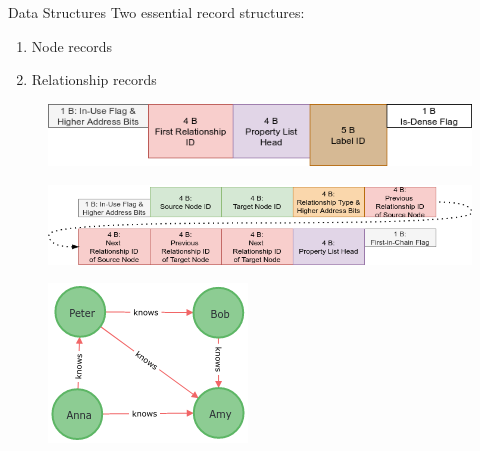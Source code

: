 \documentclass[rgb]{beamer}
\begin{document}
                \begin{frame}[allowframebreaks]{Data Structures}
                    Two essential record structures: \\ [2em]
                    \begin{enumerate}
                    \item Node records \\ [2em]
                    \item Relationship records
                    \end{enumerate}
                    
                    \framebreak
                    \begin{figure}
                     \begin{center}
                      \includegraphics[keepaspectratio, height=\textheight, width=\textwidth]{img/node_record.png}
                     \end{center}
                    \end{figure}
                    
                    \framebreak
                    \begin{figure}
                     \begin{center}
                      \includegraphics[keepaspectratio, height=\textheight, width=\textwidth]{img/relationship_record.png}
                     \end{center}
                    \end{figure}
                    
                    \framebreak
                    \begin{figure}
                     \begin{center}
                      \includegraphics[keepaspectratio, height=0.6\textheight, width=.6\textwidth]{img/graph.png}
                     \end{center}
                    \end{figure}
                    \end{frame}
                    
\end{document}
